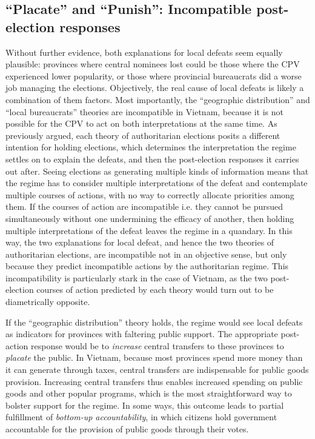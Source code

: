 \documentclass[12pt]{article}\usepackage[]{graphicx}\usepackage[]{color}
\newcommand{\1}{\mathbbm{1}}
\begin{document}
\subsection{``Placate'' and ``Punish'': Incompatible post-election responses}
\label{sec:vs}
Without further evidence, both explanations for local defeats seem equally plausible: provinces where central nominees lost could be those where the CPV experienced lower popularity, or those where provincial bureaucrats did a worse job managing the elections. Objectively, the real cause of local defeats is likely a combination of them factors. Most importantly, the ``geographic distribution'' and ``local bureaucrats'' theories are incompatible in Vietnam, because it is not possible for the CPV to act on both interpretations at the same time. As previously argued, each theory of authoritarian elections posits a different intention for holding elections, which determines the interpretation the regime settles on to explain the defeats, and then the post-election responses it carries out after. Seeing elections as generating multiple kinds of information means that the regime has to consider multiple interpretations of the defeat and contemplate multiple courses of actions, with no way to correctly allocate priorities among them. If the courses of action are incompatible i.e. they cannot be pursued simultaneously without one undermining the efficacy of another, then holding multiple interpretations of the defeat leaves the regime in a quandary. In this way, the two explanations for local defeat, and hence the two theories of authoritarian elections, are incompatible not in an objective sense, but only because they predict incompatible actions by the authoritarian regime. This incompatibility is particularly stark in the case of Vietnam, as the two post-election courses of action predicted by each theory would turn out to be diametrically opposite.

If the ``geographic distribution'' theory holds, the regime would see local defeats as indicators for provinces with faltering public support. The appropriate post-action response would be to  \textit{increase} central transfers to these provinces to \textit{placate} the public. In Vietnam, because most provinces spend more money than it can generate through taxes, central transfers are indispensable for public goods provision. Increasing central transfers thus enables increased spending on public goods and other popular programs, which is the most straightforward way to bolster support for the regime. In some ways, this outcome leads to partial fulfillment of \textit{bottom-up accountability}, in which citizens hold government accountable for the provision of public goods through their votes.
\end{document}
